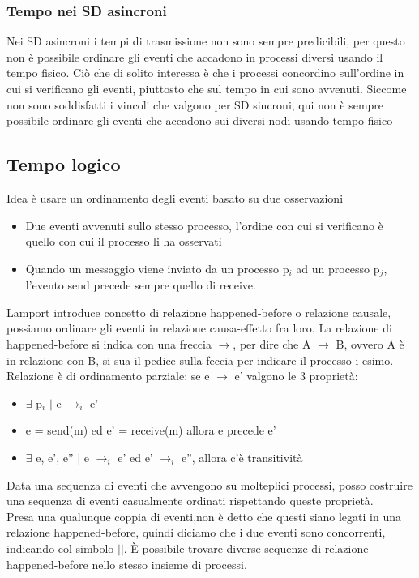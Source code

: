 \documentclass{article}
\begin{document}
\subsubsection{Tempo nei SD asincroni}
Nei SD asincroni i tempi di trasmissione non sono sempre predicibili, per questo non è possibile ordinare gli eventi che accadono in processi diversi usando il tempo fisico. Ciò che di solito interessa è che i processi concordino sull'ordine in cui si verificano gli eventi, piuttosto che sul tempo in cui sono avvenuti. Siccome non sono soddisfatti i vincoli che valgono per SD sincroni, qui non è sempre possibile ordinare gli eventi che accadono sui diversi nodi usando tempo fisico
\subsection{Tempo logico}
Idea è usare un ordinamento degli eventi basato su due osservazioni
\begin{itemize}
\item Due eventi avvenuti sullo stesso processo, l'ordine con cui si verificano è quello con cui il processo li ha osservati
\item Quando un messaggio viene inviato da un processo p$_i$ ad un processo p$_j$, l'evento send precede sempre quello di receive.
\end{itemize}
Lamport introduce concetto di relazione happened-before o relazione causale, possiamo ordinare gli eventi in relazione causa-effetto fra loro. La relazione di happened-before si indica con una freccia $\rightarrow$, per dire che  A $\rightarrow$ B, ovvero A è in relazione con B, si sua il pedice sulla feccia per indicare il processo i-esimo.\\ Relazione è di ordinamento parziale: se e $\rightarrow$ e' valgono le 3 proprietà:
\begin{itemize}
\item $\exists$ p$_i$ $|$ e $\rightarrow_i$ e'
\item e = send(m) ed e' = receive(m) allora e precede e'
\item $\exists$ e, e', e'' $|$ e $\rightarrow_i$ e' ed e' $\rightarrow_i$ e'', allora c'è transitività
\end{itemize}
Data una sequenza di eventi che avvengono su molteplici processi, posso costruire una sequenza di eventi casualmente ordinati rispettando queste proprietà.\\ Presa una qualunque coppia di eventi,non è detto che questi siano legati in una relazione happened-before, quindi diciamo che i due eventi sono concorrenti, indicando col simbolo $||$. È possibile trovare diverse sequenze di relazione happened-before nello stesso insieme di processi.
\end{document}

